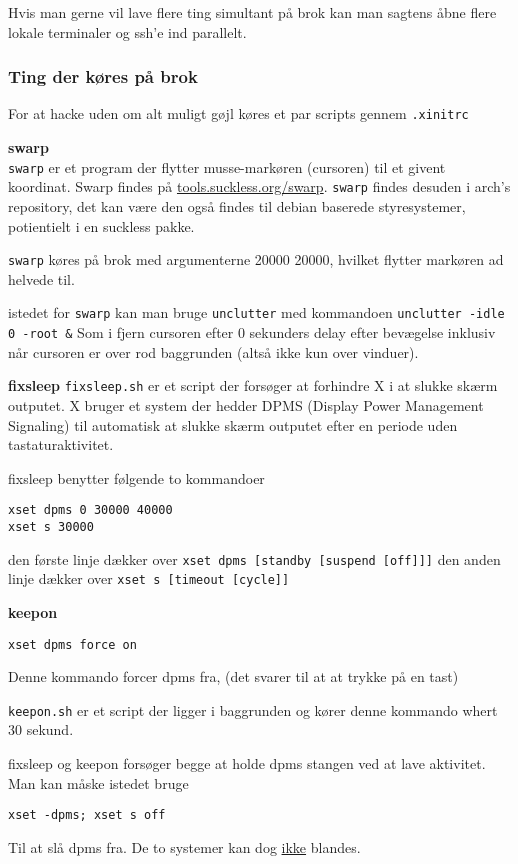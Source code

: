 \documentclass[10pt,a4paper,danish]{article}
\newcommand{\code}[1]{\colorbox{verbgray}{\texttt{#1}}}
\begin{document}
Hvis man gerne vil lave flere ting simultant på brok kan man sagtens åbne flere
lokale terminaler og ssh'e ind parallelt.




\subsubsection{Ting der køres på brok}
For at hacke uden om alt muligt gøjl køres et par scripts gennem
\texttt{.xinitrc}

\textbf{swarp}\\
\texttt{swarp} er et program der flytter musse-markøren (cursoren) til et givent koordinat.
Swarp findes på \url{tools.suckless.org/swarp}.
\texttt{swarp} findes desuden i arch's repository, det kan være den også findes til
debian baserede styresystemer, potientielt i en suckless pakke.

\texttt{swarp} køres på brok med argumenterne 20000 20000, hvilket flytter
markøren ad helvede til.

istedet for \texttt{swarp} kan man bruge \texttt{unclutter}
med kommandoen \code{unclutter -idle 0 -root \&}
Som i fjern cursoren efter 0 sekunders delay efter bevægelse inklusiv når
cursoren er over rod baggrunden (altså ikke kun over vinduer).

\textbf{fixsleep}
\texttt{fixsleep.sh} er et script der forsøger at forhindre X i at slukke skærm outputet.
X bruger et system der hedder DPMS (Display Power Management Signaling) til
automatisk at slukke skærm outputet efter en periode uden tastaturaktivitet.

fixsleep benytter følgende to kommandoer
\begin{verbatim}
xset dpms 0 30000 40000
xset s 30000
\end{verbatim}
den første linje dækker over \texttt{xset dpms [standby [suspend [off]]]}
den anden linje dækker over \texttt{xset s [timeout [cycle]]}

\textbf{keepon}
\begin{verbatim}
xset dpms force on
\end{verbatim}
Denne kommando forcer dpms fra, (det svarer til at at trykke på en tast)

\texttt{keepon.sh} er et script der ligger i baggrunden og kører denne kommando
whert 30 sekund.


fixsleep og keepon forsøger begge at holde dpms stangen ved at lave aktivitet.
Man kan måske istedet bruge
\begin{verbatim}
xset -dpms; xset s off
\end{verbatim}
Til at slå dpms fra.
De to systemer kan dog \uline{ikke} blandes.
\end{document}
